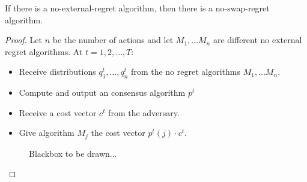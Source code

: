 \begin{thm}
If there is a no-external-regret algorithm, then there is a no-swap-regret algorithm.
\begin{proof}
Let $n$ be the number of actions and let $M_1, \ldots M_n$ are different no external regret algorithms. At $t=1,2, \ldots, T$:
\begin{itemize}
\item Receive distributions $q^t_1,\ldots ,q^t_n$ from the no regret algorithms $M_1, \ldots M_n$.
\item Compute and output an consensus algorithm $p^t$
\item Receive a cost vector $c^t$ from the adversary.
\item Give algorithm $M_j$ the cost vector $p^t(j)\cdot c^t$.
\end{itemize}

\begin{figure}[h]
\caption{Blackbox to be drawn...}
\end{figure}


\end{proof}
\end{thm}
